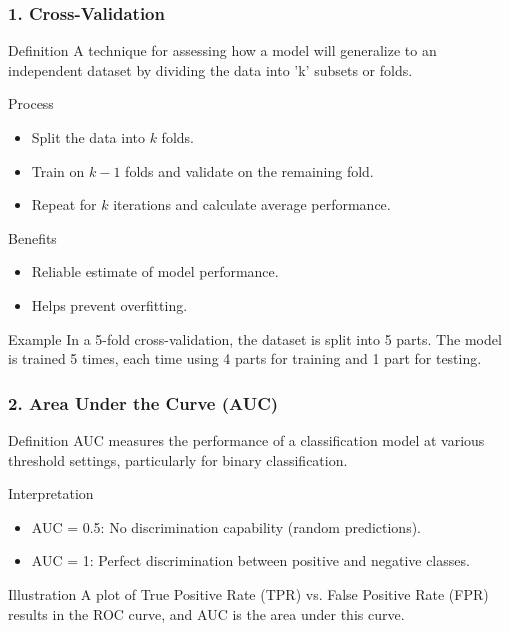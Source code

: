 \documentclass[aspectratio=169]{beamer}
\begin{document}
\begin{frame}[fragile]
    \frametitle{1. Cross-Validation}
    \begin{block}{Definition}
        A technique for assessing how a model will generalize to an independent dataset by dividing the data into 'k' subsets or folds.
    \end{block}
    
    \begin{block}{Process}
        \begin{itemize}
            \item Split the data into $k$ folds.
            \item Train on $k-1$ folds and validate on the remaining fold.
            \item Repeat for $k$ iterations and calculate average performance.
        \end{itemize}
    \end{block}

    \begin{block}{Benefits}
        \begin{itemize}
            \item Reliable estimate of model performance.
            \item Helps prevent overfitting.
        \end{itemize}
    \end{block}
    
    \begin{block}{Example}
        In a 5-fold cross-validation, the dataset is split into 5 parts. The model is trained 5 times, each time using 4 parts for training and 1 part for testing.
    \end{block}
\end{frame}

\begin{frame}[fragile]
    \frametitle{2. Area Under the Curve (AUC)}
    \begin{block}{Definition}
        AUC measures the performance of a classification model at various threshold settings, particularly for binary classification.
    \end{block}

    \begin{block}{Interpretation}
        \begin{itemize}
            \item AUC = 0.5: No discrimination capability (random predictions).
            \item AUC = 1: Perfect discrimination between positive and negative classes.
        \end{itemize}
    \end{block}

    \begin{block}{Illustration}
        A plot of True Positive Rate (TPR) vs. False Positive Rate (FPR) results in the ROC curve, and AUC is the area under this curve.
    \end{block}
\end{frame}
\end{document}
